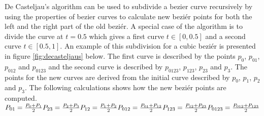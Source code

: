 De Casteljau’s algorithm can be used to subdivide a bezier curve recursively by using the properties of bezier curves to calculate new beziér points for both the left and the right part of the old beziér.\citep{fischer2000} A special case of the algorithm is to divide the curve at \begin{math}t=0.5\end{math} which gives a first curve \begin{math}t\in[0, 0.5]\end{math} and a second curve \begin{math}t\in[0.5, 1]\end{math}. An example of this subdivision for a cubic beziér is presented in figure \ref{fig:decasteljaus} below. The first curve is described by the points \begin{math}p_0\end{math}, \begin{math}p_{01}\end{math}, \begin{math}p_{012}\end{math} and \begin{math}p_{0123}\end{math} and the second curve is described by \begin{math}p_{0123}\end{math}, \begin{math}p_{123}\end{math}, \begin{math}p_{23}\end{math} and \begin{math}p_{3}\end{math}. The points for the new curves are derived from the initial curve described by \begin{math}p_{0}\end{math}, \begin{math}p_{1}\end{math}, \begin{math}p_{2}\end{math} and \begin{math}p_{3}\end{math}. The following calculations shows how the new beziér points are computed.\vspace{\baselineskip}\newline
\begin{math}
	P_{01}=\frac{P_0+P_1}{2}\newline
	P_{23}=\frac{P_2+P_3}{2}\newline
	P_{12}=\frac{P_1+P_2}{2}\newline
	P_{012}=\frac{P_{01}+P_{12}}{2}\newline
	P_{123}=\frac{P_{12}+P_{23}}{2}\newline
	P_{0123}=\frac{P_{012}+P_{123}}{2}
\end{math}\vspace{\baselineskip}\newline

